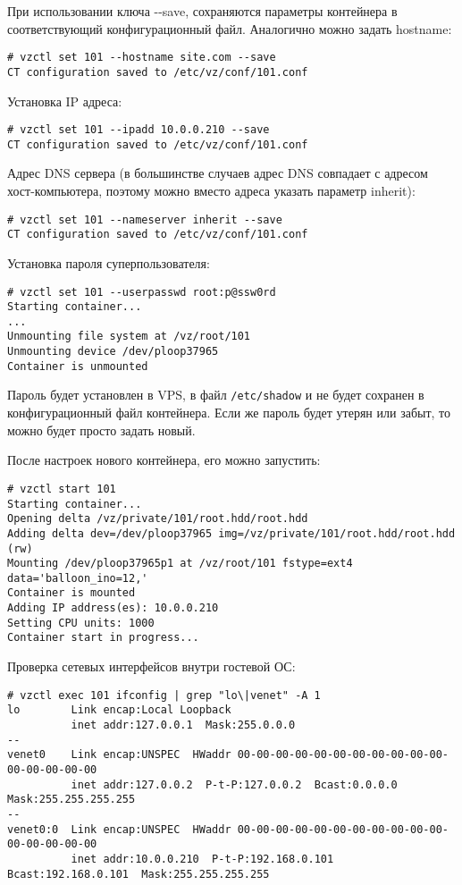 При использовании ключа -{}-save, сохраняются параметры контейнера в соответствующий конфигурационный файл.
Аналогично можно задать hostname:
\begin{lstlisting}
# vzctl set 101 --hostname site.com --save
CT configuration saved to /etc/vz/conf/101.conf
\end{lstlisting}

Установка IP адреса:
\begin{lstlisting}
# vzctl set 101 --ipadd 10.0.0.210 --save
CT configuration saved to /etc/vz/conf/101.conf
\end{lstlisting}

Адрес DNS сервера (в большинстве случаев адрес DNS совпадает с адресом хост-компьютера, поэтому можно вместо адреса указать параметр inherit):
\begin{lstlisting}
# vzctl set 101 --nameserver inherit --save
CT configuration saved to /etc/vz/conf/101.conf
\end{lstlisting}

Установка пароля суперпользователя:
\begin{lstlisting}
# vzctl set 101 --userpasswd root:p@ssw0rd
Starting container...
...
Unmounting file system at /vz/root/101
Unmounting device /dev/ploop37965
Container is unmounted
\end{lstlisting}

Пароль будет установлен в VPS, в файл \texttt{/etc/shadow} и не будет сохранен в конфигурационный файл контейнера.
Если же пароль будет утерян или забыт, то можно будет просто задать новый.

После настроек нового контейнера, его можно запустить:
\begin{lstlisting}
# vzctl start 101
Starting container...
Opening delta /vz/private/101/root.hdd/root.hdd
Adding delta dev=/dev/ploop37965 img=/vz/private/101/root.hdd/root.hdd (rw)
Mounting /dev/ploop37965p1 at /vz/root/101 fstype=ext4 data='balloon_ino=12,'
Container is mounted
Adding IP address(es): 10.0.0.210
Setting CPU units: 1000
Container start in progress...
\end{lstlisting}

Проверка сетевых интерфейсов внутри гостевой ОС:
\begin{lstlisting}
# vzctl exec 101 ifconfig | grep "lo\|venet" -A 1
lo        Link encap:Local Loopback
          inet addr:127.0.0.1  Mask:255.0.0.0
--
venet0    Link encap:UNSPEC  HWaddr 00-00-00-00-00-00-00-00-00-00-00-00-00-00-00-00
          inet addr:127.0.0.2  P-t-P:127.0.0.2  Bcast:0.0.0.0  Mask:255.255.255.255
--
venet0:0  Link encap:UNSPEC  HWaddr 00-00-00-00-00-00-00-00-00-00-00-00-00-00-00-00
          inet addr:10.0.0.210  P-t-P:192.168.0.101  Bcast:192.168.0.101  Mask:255.255.255.255
\end{lstlisting}

